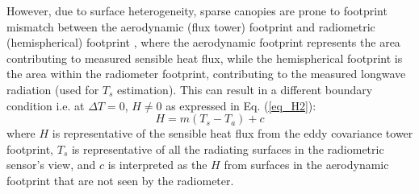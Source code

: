 \documentclass[fleqn,10pt]{wlscirep}
\begin{document}
However, due to surface heterogeneity, sparse canopies are prone to footprint mismatch between the aerodynamic (flux tower) footprint and radiometric (hemispherical) footprint \cite{chu2021representativeness,marcolla2018geometry,morillas2013using}, where the aerodynamic footprint represents the area contributing to measured sensible heat flux, while the hemispherical footprint is the area within the radiometer footprint, contributing to the measured longwave radiation (used for $T_{s}$ estimation). This can result in a different boundary condition i.e. at $\Delta T =0$, $H \not= 0$ as expressed in Eq. (\ref{eq_H2}): %
\begin{equation}\label{eq_H2}
H= m(T_{s} - T_{a}) +  c    
\end{equation}
where $H$ is representative of the sensible heat flux from the eddy covariance tower footprint, $T_{s}$ is representative of all the radiating surfaces in the radiometric sensor’s view, and $c$ is interpreted as the $H$ from surfaces in the aerodynamic footprint that are not seen by the radiometer. 
\end{document}
